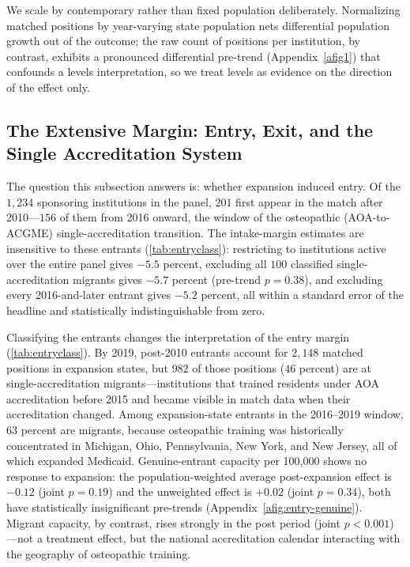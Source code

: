 We scale by contemporary rather than fixed population deliberately. Normalizing matched positions by year-varying state population nets differential population growth out of the outcome; the raw count of positions per institution, by contrast, exhibits a pronounced differential pre-trend (Appendix~\cref{afig1}) that confounds a levels interpretation, so we treat levels as evidence on the direction of the effect only. 

\subsection{The Extensive Margin: Entry, Exit, and the Single Accreditation System}\label{subsec:extensive}

The question this subsection answers is: whether expansion induced entry. Of the $1{,}234$ sponsoring institutions in the panel, $201$ first appear in the match after 2010---$156$ of them from 2016 onward, the window of the osteopathic (AOA-to-ACGME) single-accreditation transition. The intake-margin estimates are insensitive to these entrants (\cref{tab:entryclass}): restricting to institutions active over the entire panel gives $-5.5$ percent, excluding all $100$ classified single-accreditation migrants gives $-5.7$ percent (pre-trend $p = 0.38$), and excluding every 2016-and-later entrant gives $-5.2$ percent, all within a standard error of the headline and statistically indistinguishable from zero.

Classifying the entrants changes the interpretation of the entry margin (\cref{tab:entryclass}). By 2019, post-2010 entrants account for $2{,}148$ matched positions in expansion states, but $982$ of those positions ($46$ percent) are at single-accreditation migrants---institutions that trained residents under AOA accreditation before 2015 and became visible in match data when their accreditation changed. Among expansion-state entrants in the 2016--2019 window, $63$ percent are migrants, because osteopathic training was historically concentrated in Michigan, Ohio, Pennsylvania, New York, and New Jersey, all of which expanded Medicaid. Genuine-entrant capacity per 100{,}000 shows no response to expansion: the population-weighted average post-expansion effect is $-0.12$ (joint $p = 0.19$) and the unweighted effect is $+0.02$ (joint $p = 0.34$), both have statistically insignificant pre-trends (Appendix~\cref{afig:entry-genuine}). Migrant capacity, by contrast, rises strongly in the post period (joint $p < 0.001$)---not a treatment effect, but the national accreditation calendar interacting with the geography of osteopathic training.

